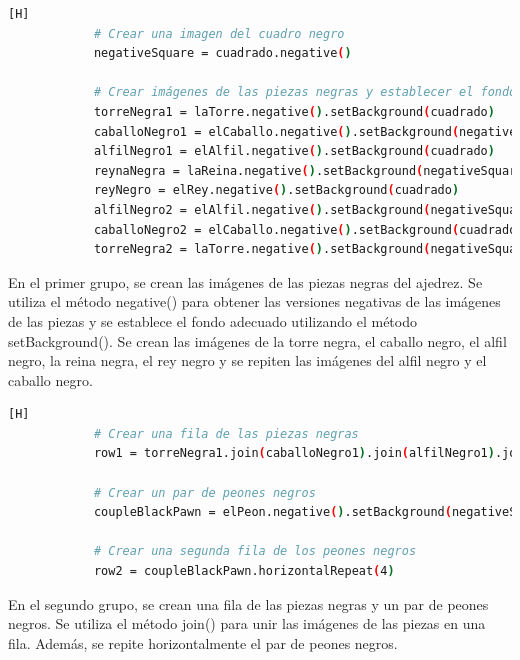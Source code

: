 \documentclass{article}
\begin{document}
	\begin{lstlisting}[language=bash,caption={\textbf{SEPTIMO EJERCICIO}: Creación de imágenes de piezas negras}][H]
            # Crear una imagen del cuadro negro
            negativeSquare = cuadrado.negative()
            
            # Crear imágenes de las piezas negras y establecer el fondo adecuado
            torreNegra1 = laTorre.negative().setBackground(cuadrado)
            caballoNegro1 = elCaballo.negative().setBackground(negativeSquare)
            alfilNegro1 = elAlfil.negative().setBackground(cuadrado)
            reynaNegra = laReina.negative().setBackground(negativeSquare)
            reyNegro = elRey.negative().setBackground(cuadrado)
            alfilNegro2 = elAlfil.negative().setBackground(negativeSquare)
            caballoNegro2 = elCaballo.negative().setBackground(cuadrado)
            torreNegra2 = laTorre.negative().setBackground(negativeSquare)
	\end{lstlisting}
En el primer grupo, se crean las imágenes de las piezas negras del ajedrez. Se utiliza el método negative() para obtener las versiones negativas de las imágenes de las piezas y se establece el fondo adecuado utilizando el método setBackground(). Se crean las imágenes de la torre negra, el caballo negro, el alfil negro, la reina negra, el rey negro y se repiten las imágenes del alfil negro y el caballo negro.

	\begin{lstlisting}[language=bash,caption={\textbf{SEPTIMO EJERCICIO}: Creación de filas de piezas negras y peones negros}][H]
            # Crear una fila de las piezas negras
            row1 = torreNegra1.join(caballoNegro1).join(alfilNegro1).join(reynaNegra).join(reyNegro).join(alfilNegro2).join(caballoNegro2).join(torreNegra1)
            
            # Crear un par de peones negros
            coupleBlackPawn = elPeon.negative().setBackground(negativeSquare).join(elPeon.negative().setBackground(cuadrado))
            
            # Crear una segunda fila de los peones negros
            row2 = coupleBlackPawn.horizontalRepeat(4)
	\end{lstlisting}
En el segundo grupo, se crean una fila de las piezas negras y un par de peones negros. Se utiliza el método join() para unir las imágenes de las piezas en una fila. Además, se repite horizontalmente el par de peones negros.
\end{document}
